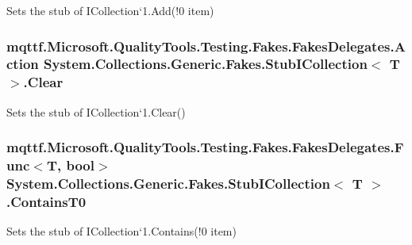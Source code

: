Sets the stub of I\-Collection`1.Add(!0 item)

\hypertarget{class_system_1_1_collections_1_1_generic_1_1_fakes_1_1_stub_i_collection_3_01_t_01_4_af52c7f20534cc248bc244ad35ba12470}{
\subsubsection[{Clear}]{\setlength{\rightskip}{0pt plus 5cm}mqttf.\-Microsoft.\-Quality\-Tools.\-Testing.\-Fakes.\-Fakes\-Delegates.\-Action System.\-Collections.\-Generic.\-Fakes.\-Stub\-I\-Collection$<$ T $>$.Clear}}\label{class_system_1_1_collections_1_1_generic_1_1_fakes_1_1_stub_i_collection_3_01_t_01_4_af52c7f20534cc248bc244ad35ba12470}


Sets the stub of I\-Collection`1.Clear()

\hypertarget{class_system_1_1_collections_1_1_generic_1_1_fakes_1_1_stub_i_collection_3_01_t_01_4_abbb4db7f06ffeac1610c098c71fd991d}{
\subsubsection[{Contains\-T0}]{\setlength{\rightskip}{0pt plus 5cm}mqttf.\-Microsoft.\-Quality\-Tools.\-Testing.\-Fakes.\-Fakes\-Delegates.\-Func$<$T, bool$>$ System.\-Collections.\-Generic.\-Fakes.\-Stub\-I\-Collection$<$ T $>$.Contains\-T0}}\label{class_system_1_1_collections_1_1_generic_1_1_fakes_1_1_stub_i_collection_3_01_t_01_4_abbb4db7f06ffeac1610c098c71fd991d}


Sets the stub of I\-Collection`1.Contains(!0 item)

